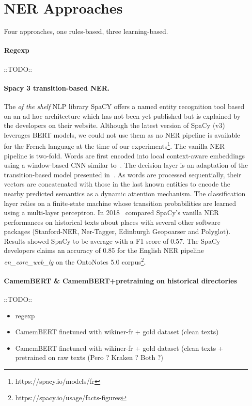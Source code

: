 \section{NER Approaches}
Four approaches, one rules-based, three learning-based.

\paragraph{Regexp}
::TODO::

\paragraph{Spacy 3 transition-based NER.}
The \textit{of the shelf} NLP library SpaCY offers a named entity recognition tool based on an ad hoc architecture which has not been yet published but is explained by the developers on their website. Although the latest version of SpaCy (v3) leverages BERT models, we could not use them as no NER pipeline is available for the French language at the time of our experiments\footnote{https://spacy.io/models/fr}. The vanilla NER pipeline is two-fold. Words are first encoded into local context-aware embeddings using a window-based CNN similar to~\cite{collobert2011}. The decision layer is an adaptation of the transition-based model presented in~\cite{lample2016}. As words are processed sequentially, their vectors are concatenated with those in the last known entities to encode the nearby predicted semantics as a dynamic attention mechanism. The classification layer relies on a finite-state machine whose transition probabilities are learned using a multi-layer perceptron.
In 2018~\cite{won2018} compared SpaCy's vanilla NER performances on historical texts about places with several other software packages (Stanford-NER, Ner-Tagger, Edinburgh Geopoarser and Polyglot). Results showed SpaCy to be average with a F1-score of 0.57. The SpaCy developers claims an accuracy of 0.85 for the English NER pipeline \textit{en\_core\_web\_lg} on the OntoNotes 5.0 corpus\footnote{https://spacy.io/usage/facts-figures}.

\paragraph{CamemBERT \& CamemBERT+pretraining on historical directories}
::TODO::

\begin{itemize}
    \item regexp
    \item CamemBERT finetuned with wikiner-fr + gold dataset (clean texts)
    \item CamemBERT finetuned with wikiner-fr + gold dataset (clean texts + pretrained on raw texts (Pero ? Kraken ? Both ?)
\end{itemize}


